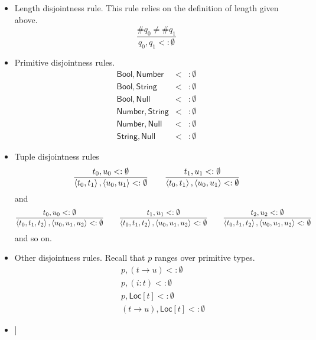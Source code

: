 \documentclass[12pt]{article}
\begin{document}
\begin{itemize}
\item Length disjointness rule. This rule relies on the definition of length
given above.%
\begin{equation*}
\frac{\#q_{0}\neq \#q_{1}}{q_{0},q_{1}<:\emptyset }
\end{equation*}

\item Primitive disjointness rules.%
\begin{eqnarray*}
\mathsf{Bool},\mathsf{Number} &<&:\emptyset  \\
\mathsf{Bool},\mathsf{String} &<&:\emptyset  \\
\mathsf{Bool},\mathsf{Null} &<&:\emptyset  \\
\mathsf{Number},\mathsf{String} &<&:\emptyset  \\
\mathsf{Number},\mathsf{Null} &<&:\emptyset  \\
\mathsf{String},\mathsf{Null} &<&:\emptyset 
\end{eqnarray*}

\item Tuple disjointness rules%
\begin{equation*}
\frac{t_{0},u_{0}<:\emptyset }{\left\langle t_{0},t_{1}\right\rangle
,\left\langle u_{0},u_{1}\right\rangle <:\emptyset }\qquad \frac{%
t_{1},u_{1}<:\emptyset }{\left\langle t_{0},t_{1}\right\rangle ,\left\langle
u_{0},u_{1}\right\rangle <:\emptyset }
\end{equation*}%
and%
\begin{equation*}
\frac{t_{0},u_{0}<:\emptyset }{\left\langle t_{0},t_{1},t_{2}\right\rangle
,\left\langle u_{0},u_{1},u_{2}\right\rangle <:\emptyset }\qquad \frac{%
t_{1},u_{1}<:\emptyset }{\left\langle t_{0},t_{1},t_{2}\right\rangle
,\left\langle u_{0},u_{1},u_{2}\right\rangle <:\emptyset }\qquad \frac{%
t_{2},u_{2}<:\emptyset }{\left\langle t_{0},t_{1},t_{2}\right\rangle
,\left\langle u_{0},u_{1},u_{2}\right\rangle <:\emptyset }
\end{equation*}%
and so on.

\item Other disjointness rules. Recall that $p$ ranges over primitive types.%
\begin{eqnarray*}
&&p,\left( t\rightarrow u\right) <:\emptyset  \\
&&p,\left( i:t\right) <:\emptyset  \\
&&p,\mathsf{Loc}[t]<:\emptyset  \\
&&\left( t\rightarrow u\right) ,\mathsf{Loc}[t]<:\emptyset 
\end{eqnarray*}

\item {}]
\end{itemize}
\end{document}
